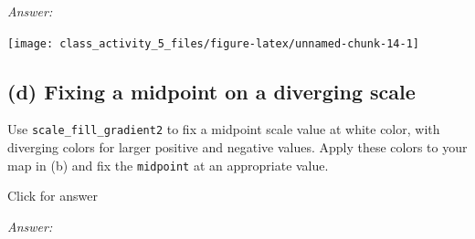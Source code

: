 \documentclass[
]{book}
\newenvironment{Shaded}{\begin{snugshade}}{\end{snugshade}}
\newcommand{\AttributeTok}[1]{\textcolor[rgb]{0.13,0.29,0.53}{#1}}
\newcommand{\CommentTok}[1]{\textcolor[rgb]{0.56,0.35,0.01}{\textit{#1}}}
\newcommand{\DecValTok}[1]{\textcolor[rgb]{0.00,0.00,0.81}{#1}}
\newcommand{\FunctionTok}[1]{\textcolor[rgb]{0.13,0.29,0.53}{\textbf{#1}}}
\newcommand{\NormalTok}[1]{#1}
\newcommand{\SpecialCharTok}[1]{\textcolor[rgb]{0.81,0.36,0.00}{\textbf{#1}}}
\newcommand{\StringTok}[1]{\textcolor[rgb]{0.31,0.60,0.02}{#1}}
\begin{document}
\emph{Answer:}

\begin{Shaded}
\end{Shaded}

\texttt{[image: class\_activity\_5\_files/figure-latex/unnamed-chunk-14-1]}

\hypertarget{d-fixing-a-midpoint-on-a-diverging-scale}{%
\subsection{(d) Fixing a midpoint on a diverging scale}\label{d-fixing-a-midpoint-on-a-diverging-scale}}

Use \texttt{scale\_fill\_gradient2} to fix a midpoint scale value at white color, with diverging colors for larger positive and negative values. Apply these colors to your map in (b) and fix the \texttt{midpoint} at an appropriate value.

Click for answer

\emph{Answer:}
\end{document}
